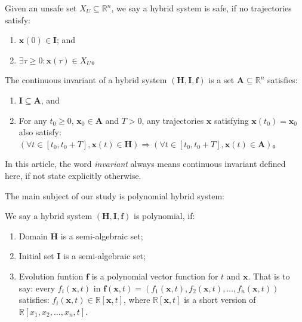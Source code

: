 \documentclass{jssc}
\begin{document}
\begin{definition}[Safety]
Given an unsafe set $X_U \subseteq \mathbb{R}^n$,  we say a hybrid system is safe, if no trajectories satisfy:
	\begin{enumerate}
		\item $\boldsymbol{x}(0) \in \boldsymbol{I}$; and
		\item $\exists \tau \geq 0 : \boldsymbol{x}(\tau) \in X_U$。
	\end{enumerate}
\end{definition}

\begin{definition}
\label{def:invariant}
The continuous invariant of a hybrid system $(\boldsymbol{H}, \boldsymbol{I}, \boldsymbol{f})$ is a set $\boldsymbol{A} \subseteq \mathbb{R}^n$ satisfies:
	\begin{enumerate}
		\item $\boldsymbol{I} \subseteq \boldsymbol{A}$, and
		\item For any $t_0 \geq 0$, $\boldsymbol{x}_0 \in \boldsymbol{A}$ and $T > 0$, any trajectories $\boldsymbol{x}$ satisfying $\boldsymbol{x}(t_0) = \boldsymbol{x}_0$ also satisfy: $(\forall t \in [t_0, t_0 + T],\boldsymbol{x}(t) \in \boldsymbol{H}) \Rightarrow (\forall t \in [t_0,t_0 + T], \boldsymbol{x}(t) \in \boldsymbol{A})$。
	\end{enumerate}
\end{definition}

In this article, the word \emph{invariant} always means continuous invariant defined here, if not state explicitly otherwise.

The main subject of our study is polynomial hybrid system:
\begin{definition}
	We say a hybrid system $(\boldsymbol{H}, \boldsymbol{I}, \boldsymbol{f})$ is polynomial, if:
	\begin{enumerate}
		\item Domain $\boldsymbol{H}$ is a semi-algebraic set;
		\item Initial set $\boldsymbol{I}$ is a semi-algebraic set;
		\item Evolution funtion $\boldsymbol{f}$ is a polynomial vector function for $t$ and $\boldsymbol{x}$. That is to say: every $f_i(\boldsymbol{x}, t)$ in $\boldsymbol{f}(\boldsymbol{x}, t) = (f_1(\boldsymbol{x}, t), f_2(\boldsymbol{x}, t), \dots, f_n(\boldsymbol{x}, t))$ satisfies: $f_i(\boldsymbol{x}, t) \in \mathbb{R}[\boldsymbol{x}, t]$, where $\mathbb{R}[\boldsymbol{x}, t]$ is a short version of $\mathbb{R}[x_1, x_2, \dots, x_n, t]$.
	\end{enumerate}
\end{definition}
\end{document}
